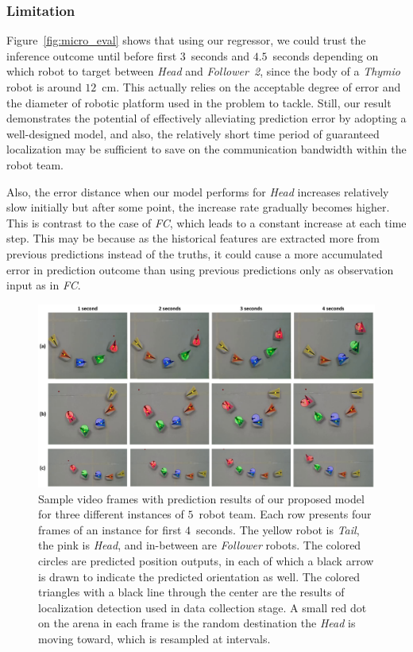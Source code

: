 \documentclass[letterpaper, 10 pt, conference]{ieeeconf}  %
\begin{document}
    \subsubsection{Limitation} 
	\label{sec:limitation}
	
	Figure~\ref{fig:micro_eval} shows that using our regressor, we could trust the inference 
	outcome until before first $3$~seconds and $4.5$~seconds depending on which robot to target between 
	\emph{Head} and \emph{Follower~2}, since the body of a \emph{Thymio} robot is around 
	$12$~cm. This actually relies on the acceptable degree of error and the diameter of 
	robotic platform used in the problem to tackle. Still, our result demonstrates the potential 
	of effectively alleviating prediction error by adopting a well-designed model, and also, 
	the relatively short time period of guaranteed localization may be sufficient to 
	save on the communication bandwidth within the robot team. 
	
	Also, the error distance when our model performs for \emph{Head} increases relatively slow 
	initially but after some point, the increase rate gradually becomes higher. This is contrast to the 
	case of \emph{FC}, which leads to a constant increase at each time step.  
	This may be because as the historical features are extracted more from previous predictions 
	instead of the truths, it could cause a more accumulated error in prediction outcome than 
	using previous predictions only as observation input as in \emph{FC}.
	
	\begin{figure}[t]
		\centering
		\includegraphics[width=2.\columnwidth]{fig_preds}
		\caption{Sample video frames with prediction results of our proposed model 
			for three different instances of $5$~robot team.
			Each row presents four frames of an instance for first $4$~seconds.   
			The yellow robot is \emph{Tail}, the pink is \emph{Head}, and
			in-between are \emph{Follower} robots. 
			The colored circles are predicted position outputs, in each 
			of which a black arrow is drawn to indicate the predicted orientation as well. 
			The colored triangles with a black line through the center are the 
			results of localization detection used in data collection stage. 
			A small red dot on the arena in each frame is the random destination the 
			\emph{Head} is moving toward, which is resampled at intervals. 
		}
		\label{fig:preds}
	\end{figure}
\end{document}

